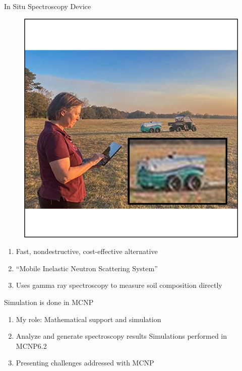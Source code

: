 \documentclass[10pt,hyperref={colorlinks,citecolor=blue,urlcolor=peking_blue,linkcolor=}]{beamer}
\theoremstyle{plain}
\begin{document}
\begin{frame}{In Situ Spectroscopy Device}
\begin{figure}[MINS on Field]
\begin{center}
\includegraphics[width=.5\linewidth]{../Figures/Misc/MINSInField.png}
\end{center}
\end{figure}
\begin{enumerate}
\item Fast, nondestructive, cost-effective alternative
\item “Mobile Inelastic Neutron Scattering System”
\item Uses gamma ray spectroscopy to measure soil composition directly
\end{enumerate}
\end{frame}
\begin{frame}{Simulation is done in MCNP}
\begin{enumerate}
\item My role: Mathematical support and simulation
\item Analyze and generate spectroscopy results
Simulations performed in MCNP6.2
\item Presenting challenges addressed with MCNP
\end{enumerate}
\end{frame}
\end{document}
